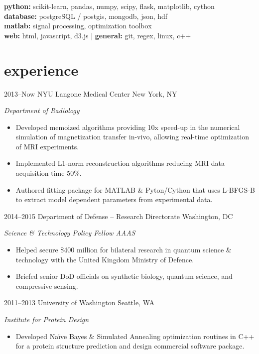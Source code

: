 \documentclass[]{friggeri-cv} %
\begin{document}
\textbf{python:} scikit-learn, pandas, numpy, scipy, flask, matplotlib, cython  \\ \textbf{database:} postgreSQL / postgis, mongodb, json, hdf \\ \textbf{matlab:} signal processing, optimization toolbox \\ \textbf{web:} html, javascript, d3.js  |  \textbf{general:} git, regex, linux, c++


\section{experience}


\begin{entrylist}


\entry
{2013--Now}
{NYU Langone Medical Center}
{New York, NY}
{\emph{Department of Radiology}
\begin{itemize}
\item Developed memoized algorithms providing 10x speed-up in the numerical simulation of magnetization transfer in-vivo, allowing real-time optimization of MRI experiments.
\item Implemented L1-norm reconstruction algorithms reducing MRI data acquisition time 50\%.  
\item Authored fitting package for MATLAB \& Pyton/Cython that uses L-BFGS-B to extract model dependent parameters from experimental data.    
\end{itemize}}

\entry
{2014--2015}
{Department of Defense -- Research Directorate}
{Washington, DC}
{\emph{Science \& Technology Policy Fellow AAAS}
\begin{itemize}
\item Helped secure \$400 million for bilateral research in quantum science \& technology with the United Kingdom Ministry of Defence. 
\item Briefed senior DoD officials on synthetic biology, quantum science, and compressive sensing.
\end{itemize}}

\entry
{2011--2013}
{University of Washington}
{Seattle, WA}
{\emph{Institute for Protein Design}
\begin{itemize}
\item Developed Na{\"i}ve Bayes \& Simulated Annealing optimization routines in C++ for a protein structure prediction and design commercial software package.\end{itemize}}


\end{entrylist}
\end{document}
